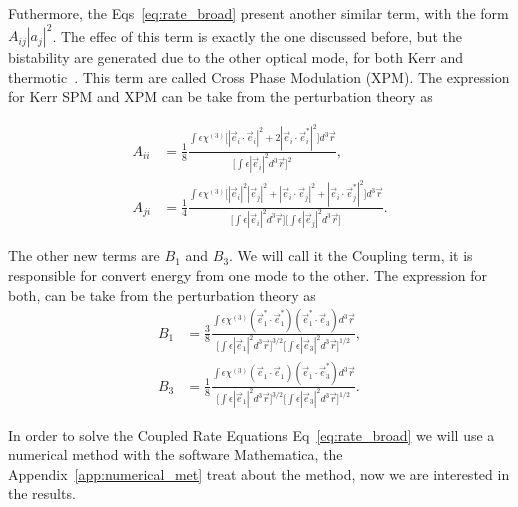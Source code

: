 Futhermore, the Eqs~\ref{eq:rate_broad} present another similar term, with the form $A_{ij}|a_j|^2$. The effec of this term is exactly the one discussed before, but the bistability are generated due to the other optical mode, for both Kerr and thermotic~\needcit. This term are called Cross Phase Modulation (XPM). The expression for Kerr SPM and XPM can be take from the perturbation theory as 


\begin{subequations}
    \begin{alignat}{1}
        A_{ii} &= \frac{1}{8}\frac{\int\epsilon\chi^{(3)}
        \Big[|\vec{e}_i\cdot\vec{e}_i|^2 + 2|\vec{e}_i\cdot\vec{e}_i^*|^2
        \Big]d^3\vec{r}}{\Big[\int \epsilon|\vec{e}_i|^2 d^3\vec{r}\Big]^2},
        \\
        A_{ji} &= \frac{1}{4}\frac{\int\epsilon\chi^{(3)}
        \Big[|\vec{e}_i|^2|\vec{e}_j|^2 + |\vec{e}_i\cdot\vec{e}_j|^2+ |\vec{e}_i\cdot\vec{e}_j^*|^2
        \Big]d^3\vec{r}}{\Big[\int \epsilon|\vec{e}_i|^2 d^3\vec{r}\Big]\Big[\int \epsilon|\vec{e}_j|^2 d^3\vec{r}\Big]}.
    \end{alignat}
\end{subequations}

The other new terms are $B_1$ and $B_3$.%
We will call it the Coupling term, it is responsible for convert energy from one mode to the other. The expression for both, can be take from the perturbation theory as
\begin{subequations}
    \begin{alignat}{1}
        B_{1} &= \frac{3}{8}\frac{\int\epsilon\chi^{(3)}
        (\vec{e}_1^*\cdot\vec{e}_1^*)(\vec{e}_1^*\cdot\vec{e}_3)
        d^3\vec{r}}{\Big[\int \epsilon|\vec{e}_1|^2 d^3\vec{r}\Big]^{3/2}\Big[\int \epsilon|\vec{e}_3|^2 d^3\vec{r}\Big]^{1/2}},
        \label{eq:coupling_b1}
        \\
        B_{3} &= \frac{1}{8}\frac{\int\epsilon\chi^{(3)}
        (\vec{e}_1\cdot\vec{e}_1)(\vec{e}_1\cdot\vec{e}^*_3)
        d^3\vec{r}}{\Big[\int \epsilon|\vec{e}_1|^2 d^3\vec{r}\Big]^{3/2}\Big[\int \epsilon|\vec{e}_3|^2 d^3\vec{r}\Big]^{1/2}}.
        \label{eq:coupling_b3}
    \end{alignat}
    \label{eq:coupling}
\end{subequations}

In order to solve the Coupled Rate Equations Eq~\ref{eq:rate_broad} we will use a numerical method with the software Mathematica, the Appendix~\ref{app:numerical_met} treat about the method, now we are interested in the results. 


